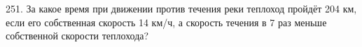 251. За какое время при движении против течения реки теплоход пройдёт 204 км, если его собственная скорость 14 км/ч, а скорость течения в 7 раз меньше собственной скорости теплохода?\\
